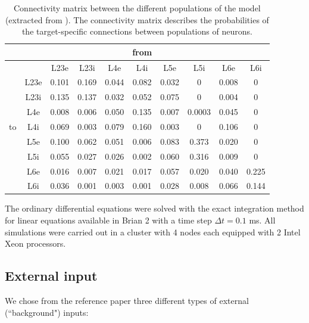\documentclass[10pt,a4paper,onecolumn]{article}
\begin{document}
\begin{table}[!ht]
\caption{\label{table:conectivity} Connectivity matrix between the different populations of the model (extracted from \cite{potjans2014}). The connectivity matrix describes the probabilities of the target-specific connections between populations of neurons.
}
\begin{center}
\begin{tabular}{lccccccccc}
 \toprule
 \midrule
 &  &  &  &  & from &  &  &  & \tabularnewline
  \midrule
 &  & L23e & L23i & L4e & L4i & L5e & L5i & L6e & L6i\tabularnewline
 \midrule
 & L23e & 0.101 & 0.169 & 0.044 & 0.082 & 0.032 & 0 & 0.008 & 0\tabularnewline
 & L23i & 0.135 & 0.137 & 0.032 & 0.052 & 0.075 & 0 & 0.004 & 0\tabularnewline
 & L4e & 0.008 & 0.006 & 0.050 & 0.135 & 0.007 & 0.0003 & 0.045 & 0\tabularnewline
 to & L4i & 0.069 & 0.003 & 0.079 & 0.160 & 0.003 & 0 & 0.106 & 0\tabularnewline
 & L5e & 0.100 & 0.062 & 0.051 & 0.006 & 0.083 & 0.373 & 0.020 & 0\tabularnewline
 & L5i & 0.055 & 0.027 & 0.026 & 0.002 & 0.060 & 0.316 & 0.009 & 0\tabularnewline
 & L6e & 0.016 & 0.007 & 0.021 & 0.017 & 0.057 & 0.020 & 0.040 & 0.225\tabularnewline
 & L6i & 0.036 & 0.001 & 0.003 & 0.001 & 0.028 & 0.008 & 0.066 & 0.144\tabularnewline
\bottomrule
\end{tabular}
\end{center}
\end{table}

The ordinary differential equations were solved with the exact integration method for linear equations available in Brian 2 with a time step $\Delta t=0.1$ ms. All simulations were carried out in a cluster with 4 nodes each equipped with 2 Intel Xeon processors. 

\subsection{External input}

We chose from the reference paper three different types of external (``background") inputs: 
\end{document}
